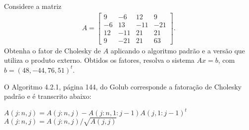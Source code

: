 \documentclass[a4paper,12pt, leqno, answers]{exam}
\begin{document}
\begin{questions}
    \question Considere a matriz
    \begin{align*}
        A = \begin{bmatrix}
            9 & -6 & 12 & 9 \\
            -6 & 13 & -11 & -21 \\
            12 & -11 & 21 & 21 \\
            9 & -21 & 21 & 63
        \end{bmatrix}.
    \end{align*}
    Obtenha o fator de Cholesky de $A$ aplicando o algoritmo padr\~{a}o e a vers\~{a}o que utiliza o produto externo. Obtidos os fatores, resolva o sistema $A x = b$, com $b = \left( 48, -44, 76, 51 \right)^t$.
    \begin{solution}
        O Algoritmo 4.2.1, p\'{a}gina 144, do Golub\nocite{Golub:1996:matrix} corresponde a fatora\c{c}\~{a}o de Cholesky padr\~{a}o e \'{e} transcrito abaixo:
        \begin{algorithmic}
                    \State $A(j:n, j) = A(j:n, j) - A(j:n, 1:j - 1) A(j, 1:j - 1)^t$
                \EndIf
                \State $A(j:n, j) = A(j:n, j) / \sqrt{A(j,j)}$
            \EndFor
        \end{algorithmic}


\end{solution}
\end{questions}
\end{document}

